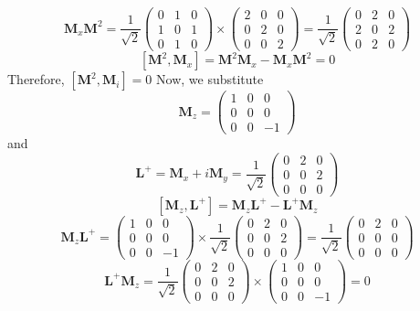 \documentclass{styles/kaobook}
\begin{document}
$$
\mathbf{M}_{x} \mathbf{M}^{2}=\frac{1}{\sqrt{2}}\left(\begin{array}{lll}
0 & 1 & 0 \\
1 & 0 & 1 \\
0 & 1 & 0
\end{array}\right) \times\left(\begin{array}{lll}
2 & 0 & 0 \\
0 & 2 & 0 \\
0 & 0 & 2
\end{array}\right)=\frac{1}{\sqrt{2}}\left(\begin{array}{lll}
0 & 2 & 0 \\
2 & 0 & 2 \\
0 & 2 & 0
\end{array}\right)
$$
$$
\left[\mathbf{M}^{2}, \mathbf{M}_{x}\right]=\mathbf{M}^{2} \mathbf{M}_{x}-\mathbf{M}_{x} \mathbf{M}^{2}=0
$$
Therefore, $\left[\mathbf{M}^{2}, \mathbf{M}_{i}\right]=0$
Now, we substitute 
$$
\mathbf{M}_{z}=\left(\begin{array}{ccc}
1 & 0 & 0 \\
0 & 0 & 0 \\
0 & 0 & -1
\end{array}\right)
$$
and
$$
\mathbf{L}^{+}=\mathbf{M}_{x}+i \mathbf{M}_{y}=\frac{1}{\sqrt{2}}\left(\begin{array}{lll}
0 & 2 & 0 \\
0 & 0 & 2 \\
0 & 0 & 0
\end{array}\right)
$$
$$
\left[\mathbf{M}_{z}, \mathbf{L}^{+}\right]=\mathbf{M}_{z} \mathbf{L}^{+}-\mathbf{L}^{+} \mathbf{M}_{z}
$$
$$
\mathbf{M}_{z} \mathbf{L}^{+}=\left(\begin{array}{ccc}
1 & 0 & 0 \\
0 & 0 & 0 \\
0 & 0 & -1
\end{array}\right) \times \frac{1}{\sqrt{2}}\left(\begin{array}{ccc}
0 & 2 & 0 \\
0 & 0 & 2 \\
0 & 0 & 0
\end{array}\right)=\frac{1}{\sqrt{2}}\left(\begin{array}{lll}
0 & 2 & 0 \\
0 & 0 & 0 \\
0 & 0 & 0
\end{array}\right)
$$
$$
\mathbf{L}^{+} \mathbf{M}_{z}=\frac{1}{\sqrt{2}}\left(\begin{array}{ccc}
0 & 2 & 0 \\
0 & 0 & 2 \\
0 & 0 & 0
\end{array}\right) \times\left(\begin{array}{ccc}
1 & 0 & 0 \\
0 & 0 & 0 \\
0 & 0 & -1
\end{array}\right)=0
$$
\end{document}
